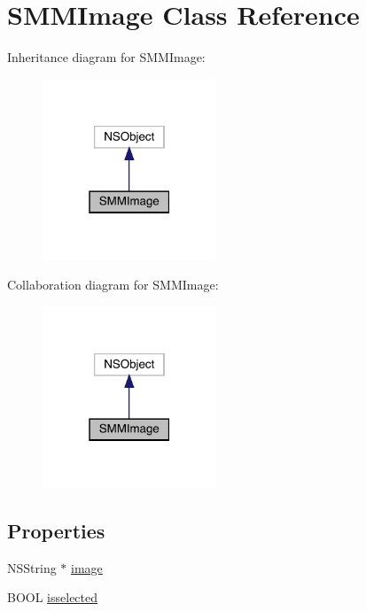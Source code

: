 \hypertarget{interface_s_m_m_image}{}\section{S\+M\+M\+Image Class Reference}
\label{interface_s_m_m_image}


Inheritance diagram for S\+M\+M\+Image\+:\nopagebreak
\begin{figure}[H]
\begin{center}
\leavevmode
\includegraphics[width=147pt]{interface_s_m_m_image__inherit__graph}
\end{center}
\end{figure}


Collaboration diagram for S\+M\+M\+Image\+:\nopagebreak
\begin{figure}[H]
\begin{center}
\leavevmode
\includegraphics[width=147pt]{interface_s_m_m_image__coll__graph}
\end{center}
\end{figure}
\subsection*{Properties}
\begin{DoxyCompactItemize}
\item 
N\+S\+String $\ast$ \mbox{\hyperlink{interface_s_m_m_image_a3b5e61680fe0629a7ca80d891d4f49d5}{image}}
\item 
B\+O\+OL \mbox{\hyperlink{interface_s_m_m_image_a8e644dbe620fcb70c01a9b31ea86fddc}{isselected}}
\end{DoxyCompactItemize}



